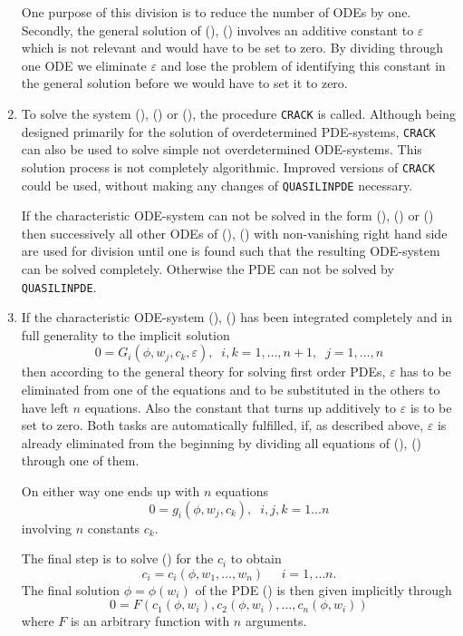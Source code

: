 \begin{enumerate}
One purpose of this division is to reduce the number of ODEs by one.
Secondly, the general solution of (), () involves
an additive constant to $\varepsilon$ which is not relevant and would
have to be set to zero. By dividing through one ODE we eliminate
$\varepsilon$ and lose the problem of identifying this constant in the
general solution before we would have to set it to zero.

\item %
To solve the system (), () or (),
the procedure \texttt{CRACK} is called.
Although being designed primarily for the solution of overdetermined
PDE-systems, \texttt{CRACK} can also be used to solve simple not
overdetermined ODE-systems. This solution
process is not completely algorithmic. Improved versions of \texttt{CRACK}
could be used, without making any changes of \texttt{QUASILINPDE}
necessary.

If the characteristic ODE-system can not be solved in the form
(), () or ()
then successively all other ODEs of (), ()
with non-vanishing right hand side are used for division until
one is found
such that the resulting ODE-system can be solved completely.
Otherwise the PDE can not be solved by \texttt{QUASILINPDE}.

\item %
If the characteristic ODE-system (), () has been
integrated completely and in full generality to the implicit solution
\begin{equation}
0 = G_i(\phi, w_j, c_k, \varepsilon),\;\;
i,k=1,\ldots,n+1,\;\;j=1,\ldots,n              \label{charsol1}
\end{equation}
then according to the general theory for solving first order PDEs,
$\varepsilon$ has
to be eliminated from one of the equations and to be substituted in the
others to have left $n$ equations.
Also the constant that turns up additively to $\varepsilon$
is to be set to zero. Both tasks are automatically
fulfilled, if, as described above, $\varepsilon$ is already eliminated
from the beginning by dividing all equations of (),
()
through one of them.

On either way one ends up with $n$ equations
\begin{equation}
0=g_i(\phi,w_j,c_k),\;\;i,j,k=1\ldots n             \label{charsol2}
\end{equation}
involving $n$ constants $c_k$.

The final step is to solve () for the $c_i$ to obtain
\begin{equation}
c_i = c_i(\phi, w_1,\ldots ,w_n) \;\;\;\;\;i=1,\ldots n  . \label{cons}
\end{equation}
The final solution $\phi = \phi(w_i)$ of the PDE () is then
given implicitly through
\[ 0 = F(c_1(\phi,w_i),c_2(\phi,w_i),\ldots,c_n(\phi,w_i)) \]
where $F$ is an arbitrary function with $n$ arguments.
\end{enumerate}
